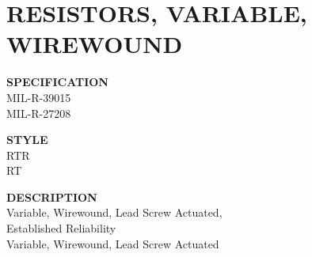 \section{RESISTORS, VARIABLE, WIREWOUND}

\begin{minipage}[t]{0.24\textwidth}
    \textbf{SPECIFICATION}\\
    MIL-R-39015\\MIL-R-27208
\end{minipage}
\hfill
\begin{minipage}[t]{0.12\textwidth}
    \textbf{STYLE}\\
    RTR\\RT
\end{minipage}
\hfill
\begin{minipage}[t]{0.61\textwidth}
    \textbf{DESCRIPTION}\\
    Variable, Wirewound, Lead Screw Actuated,\\Established Reliability\\Variable, Wirewound, Lead Screw Actuated
\end{minipage}

